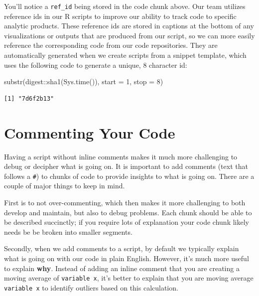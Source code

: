 \documentclass[
  letterpaper,
  DIV=11,
  numbers=noendperiod]{scrreprt}
\newenvironment{Shaded}{\begin{snugshade}}{\end{snugshade}}
\newcommand{\AttributeTok}[1]{\textcolor[rgb]{0.40,0.45,0.13}{#1}}
\newcommand{\DecValTok}[1]{\textcolor[rgb]{0.68,0.00,0.00}{#1}}
\newcommand{\FunctionTok}[1]{\textcolor[rgb]{0.28,0.35,0.67}{#1}}
\newcommand{\NormalTok}[1]{\textcolor[rgb]{0.00,0.23,0.31}{#1}}
\newcommand{\SpecialCharTok}[1]{\textcolor[rgb]{0.37,0.37,0.37}{#1}}
\begin{document}
You'll notice a \texttt{ref\_id} being stored in the code chunk above.
Our team utilizes reference ids in our R scripts to improve our ability
to track code to specific analytic products. These reference ids are
stored in captions at the bottom of any visualizations or outputs that
are produced from our script, so we can more easily reference the
corresponding code from our code repositories. They are automatically
generated when we create scripts from a snippet template, which uses the
following code to generate a unique, 8 character id:

\begin{Shaded}
\begin{Highlighting}[]
\FunctionTok{substr}\NormalTok{(digest}\SpecialCharTok{::}\FunctionTok{sha1}\NormalTok{(}\FunctionTok{Sys.time}\NormalTok{()), }\AttributeTok{start =} \DecValTok{1}\NormalTok{, }\AttributeTok{stop =} \DecValTok{8}\NormalTok{)}
\end{Highlighting}
\end{Shaded}

\begin{verbatim}
[1] "7d6f2b13"
\end{verbatim}

\hypertarget{commenting-your-code}{%
\section{Commenting Your Code}\label{commenting-your-code}}

Having a script without inline comments makes it much more challenging
to debug or decipher what is going on. It is important to add comments
(text that follows a \texttt{\#}) to chunks of code to provide insights
to what is going on. There are a couple of major things to keep in mind.

First is to not over-commenting, which then makes it more challenging to
both develop and maintain, but also to debug problems. Each chunk should
be able to be described succinctly; if you require lots of explanation
your code chunk likely needs be be broken into smaller segments.

Secondly, when we add comments to a script, by default we typically
explain what is going on with our code in plain English. However, it's
much more useful to explain \textbf{why}. Instead of adding an inline
comment that you are creating a moving average of \texttt{variable\ x},
it's better to explain that you are moving average \texttt{variable\ x}
to identify outliers based on this calculation.
\end{document}
